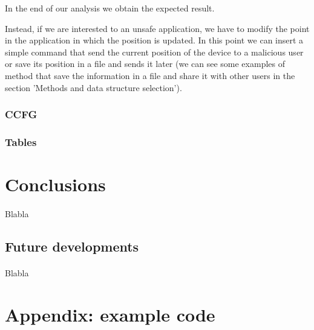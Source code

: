 \documentclass[letterpaper,twocolumn,10pt]{article}
\begin{document}
In the end of our analysis we obtain the expected result.

Instead, if we are interested to an unsafe application, we have to modify the point in the application in which the position is updated. In this point we can insert a simple command that send the current position of the device to a malicious user or save its position in a file and sends it later (we can see some examples of method that save the information in a file and share it with other users in the section 'Methods and data structure selection').

\subsubsection{CCFG}

\subsubsection{Tables}

\section{Conclusions}
\paragraph{}
Blabla

\subsection{Future developments}
\paragraph{}
Blabla


{\footnotesize 

}

\theendnotes

\vfill
\break

\onecolumn
\appendix
\label{app:appendixA}
\lstset{language=Java}  
\section{Appendix: example code}
\end{document}
